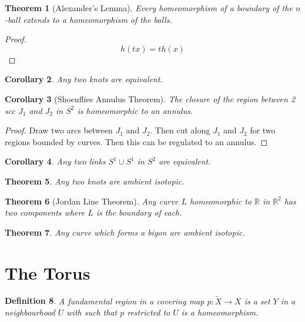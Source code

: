 \documentclass{article}
\newtheorem{theorem}{Theorem}
\newtheorem{corollary}[theorem]{Corollary}
\newtheorem{definition}[theorem]{Definition}
\theoremstyle{definition}
\numberwithin{theorem}{section}
\numberwithin{equation}{section}
\begin{document}
\begin{theorem}[Alexander's Lemma]
    Every homeomorphism of a boundary of the $n$-ball extends to a homeomorphism of the balls. 
\end{theorem}

\begin{proof}
    \begin{equation}
        h(tx) = t h(x)
    \end{equation}
\end{proof}

\begin{corollary}
    Any two knots are equivalent. 
\end{corollary}

\begin{corollary}[Shoenflies Annulus Theorem]
    The closure of the region between 2 scc $J_1$ and $J_2$ in $S^2$ is homeomorphic to an annulus. 
\end{corollary}

\begin{proof}
    Draw two arcs between $J_1$ and $J_2$. Then cut along $J_1$ and $J_2$ for two regions bounded by curves. Then this can be regulated to an annulus. 
\end{proof}

\begin{corollary}
    Any two links $S^1 \cup S^1$ in $S^2$ are equivalent. 
\end{corollary}

\begin{theorem}
    Any two knots are ambient isotopic.
\end{theorem}

\begin{theorem}[Jordan Line Theorem]
    Any curve $L$ homeomorphic to $\mathbb{R}$ in $\mathbb{R}^2$ has two components where $L$ is the boundary of each. 
\end{theorem}

\begin{theorem}
    Any curve which forms a bigon are ambient isotopic. 
\end{theorem}

\section{The Torus}

\begin{definition}
    A fundamental region in a covering map $p: \widetilde{X} \rightarrow X$ is a set $Y$ in a neighbourhood $U$ with such that $p$ restricted to $U$ is a homeomorphism.
\end{definition}
\end{document}
